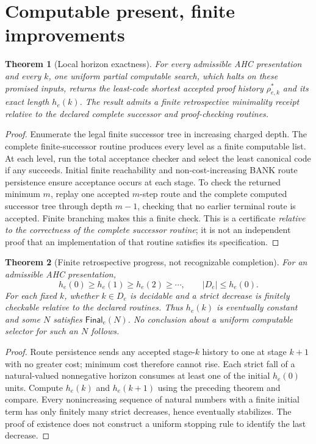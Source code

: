 \documentclass[11pt,letterpaper]{article}
\newtheorem{theorem}{Theorem}[section]
\theoremstyle{definition}
\theoremstyle{remark}
\newcommand{\Fin}{\mathsf{Final}}
\begin{document}
\section{Computable present, finite improvements}
\begin{theorem}[Local horizon exactness]
For every admissible AHC presentation and every $k$, one uniform partial computable search, which halts on these promised inputs, returns the least-code shortest accepted proof history $\rho^*_{e,k}$ and its exact length $h_e(k)$. The result admits a finite retrospective minimality receipt relative to the declared complete successor and proof-checking routines.
\end{theorem}
\begin{proof}
Enumerate the legal finite successor tree in increasing charged depth. The complete finite-successor routine produces every level as a finite computable list. At each level, run the total acceptance checker and select the least canonical code if any succeeds. Initial finite reachability and non-cost-increasing BANK route persistence ensure acceptance occurs at each stage. To check the returned minimum $m$, replay one accepted $m$-step route and the complete computed successor tree through depth $m-1$, checking that no earlier terminal route is accepted. Finite branching makes this a finite check. This is a certificate \emph{relative to the correctness of the complete successor routine}; it is not an independent proof that an implementation of that routine satisfies its specification.
\end{proof}

\begin{theorem}[Finite retrospective progress, not recognizable completion]
For an admissible AHC presentation,
\[
h_e(0)\ge h_e(1)\ge h_e(2)\ge\cdots,\qquad |D_e|\le h_e(0).
\]
For each fixed $k$, whether $k\in D_e$ is decidable and a strict decrease is finitely checkable relative to the declared routines. Thus $h_e(k)$ is eventually constant and some $N$ satisfies $\Fin_e(N)$. No conclusion about a uniform computable selector for such an $N$ follows.
\end{theorem}
\begin{proof}
Route persistence sends any accepted stage-$k$ history to one at stage $k+1$ with no greater cost; minimum cost therefore cannot rise. Each strict fall of a natural-valued nonnegative horizon consumes at least one of the initial $h_e(0)$ units. Compute $h_e(k)$ and $h_e(k+1)$ using the preceding theorem and compare. Every nonincreasing sequence of natural numbers with a finite initial term has only finitely many strict decreases, hence eventually stabilizes. The proof of existence does not construct a uniform stopping rule to identify the last decrease.
\end{proof}
\end{document}
